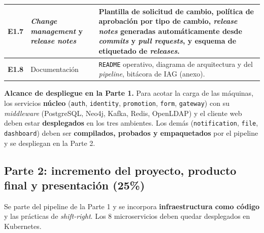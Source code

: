 \documentclass[10pt,letterpaper]{article}
\begin{document}
\begin{tabularx}{\textwidth}{|L{1.0cm}|L{3.3cm}|X|}
\textbf{E1.7} & \textit{Change management} y \textit{release notes} & Plantilla de solicitud de cambio, política de aprobación por tipo de cambio, \textit{release notes} generadas automáticamente desde \textit{commits} y \textit{pull requests}, y esquema de etiquetado de \textit{releases}. \\ \hline
\textbf{E1.8} & Documentación& \texttt{README} operativo, diagrama de arquitectura y del \textit{pipeline}, bitácora de IAG (anexo). \\ \hline
\end{tabularx}

\vspace{0.08cm}
\noindent\small\textbf{Alcance de despliegue en la Parte 1.} Para acotar la carga de las máquinas, los servicios \textbf{núcleo} (\texttt{auth}, \texttt{identity}, \texttt{promotion}, \texttt{form}, \texttt{gateway}) con su \textit{middleware} (PostgreSQL, Neo4j, Kafka, Redis, OpenLDAP) y el cliente web deben estar \textbf{desplegados} en los tres ambientes. Los demás (\texttt{notification}, \texttt{file}, \texttt{dashboard}) deben ser \textbf{compilados, probados y empaquetados} por el pipeline y se despliegan en la Parte 2.

\subsection{Parte 2: incremento del proyecto, producto final y presentación (25\%)}
Se parte del pipeline de la Parte 1 y se incorpora \textbf{infraestructura como código} y las prácticas de \textit{shift-right}. Los 8 microservicios deben quedar desplegados en Kubernetes.
\end{document}
